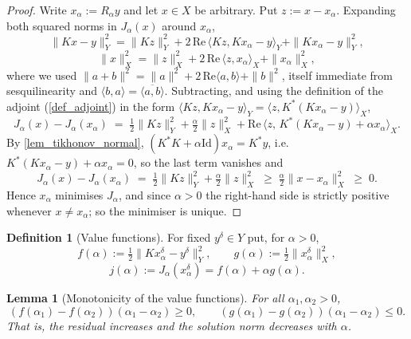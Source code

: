 \documentclass[a4paper]{report}
\theoremstyle{plain}
\newtheorem{lemma}[theorem]{Lemma}
\theoremstyle{definition}
\newtheorem{definition}[theorem]{Definition}
\theoremstyle{remark}
\newcommand{\Id}{\mathrm{Id}}
\begin{document}
\begin{proof}
  Write $x_{\alpha} := R_{\alpha}y$ and let $x \in X$ be arbitrary.  Put $z := x -
  x_{\alpha}$.  Expanding both squared norms in $J_{\alpha}(x)$ around $x_{\alpha}$,
  \[
    \|Kx - y\|_Y^{2} = \|Kz\|_Y^{2} + 2\,\mathrm{Re}\,\langle Kz, Kx_{\alpha}-y\rangle_Y
      + \|Kx_{\alpha}-y\|_Y^{2},
  \]
  \[
    \|x\|_X^{2} = \|z\|_X^{2} + 2\,\mathrm{Re}\,\langle z, x_{\alpha}\rangle_X
      + \|x_{\alpha}\|_X^{2},
  \]
  where we used $\|a+b\|^{2} = \|a\|^{2} + 2\,\mathrm{Re}\langle a,b\rangle + \|b\|^{2}$,
  itself immediate from sesquilinearity and $\langle b,a\rangle = \overline{\langle a,b
  \rangle}$.  Subtracting, and using the definition of the adjoint (\cref{def_adjoint}) in
  the form $\langle Kz, Kx_{\alpha}-y\rangle_Y = \langle z, K^{*}(Kx_{\alpha}-y)
  \rangle_X$,
  \[
    J_{\alpha}(x) - J_{\alpha}(x_{\alpha}) \;=\; \tfrac12\|Kz\|_Y^{2}
      + \tfrac{\alpha}{2}\|z\|_X^{2}
      + \mathrm{Re}\,\bigl\langle z,\, K^{*}(Kx_{\alpha}-y) + \alpha x_{\alpha}
        \bigr\rangle_X .
  \]
  By \cref{lem_tikhonov_normal}, $(K^{*}K+\alpha\Id)x_{\alpha} = K^{*}y$, i.e.\
  $K^{*}(Kx_{\alpha}-y) + \alpha x_{\alpha} = 0$, so the last term vanishes and
  \[
    J_{\alpha}(x) - J_{\alpha}(x_{\alpha}) \;=\; \tfrac12\|Kz\|_Y^{2}
      + \tfrac{\alpha}{2}\|z\|_X^{2} \;\ge\; \tfrac{\alpha}{2}\|x - x_{\alpha}\|_X^{2}
      \;\ge\; 0 .
  \]
  Hence $x_{\alpha}$ minimises $J_{\alpha}$, and since $\alpha > 0$ the right-hand side
  is strictly positive whenever $x \ne x_{\alpha}$; so the minimiser is unique.
\end{proof}


\begin{definition}[Value functions]
  \label{def_value_functions}
  For fixed $y^{\delta} \in Y$ put, for $\alpha > 0$,
  \[
    f(\alpha) := \tfrac12\|Kx^{\delta}_{\alpha} - y^{\delta}\|_Y^{2},
    \qquad
    g(\alpha) := \tfrac12\|x^{\delta}_{\alpha}\|_X^{2},
  \]
  \[
    j(\alpha) := J_{\alpha}(x^{\delta}_{\alpha}) = f(\alpha) + \alpha g(\alpha) .
  \]
\end{definition}


\begin{lemma}[Monotonicity of the value functions]
  \label{lem_value_monotone}
  For all $\alpha_1, \alpha_2 > 0$,
  \[
    (f(\alpha_1) - f(\alpha_2))(\alpha_1 - \alpha_2) \ge 0,
    \qquad
    (g(\alpha_1) - g(\alpha_2))(\alpha_1 - \alpha_2) \le 0 .
  \]
  That is, the residual increases and the solution norm decreases with $\alpha$.
\end{lemma}
\end{document}
